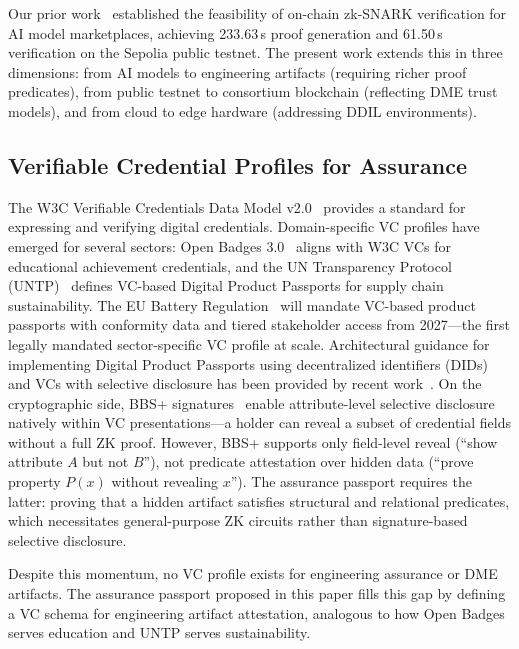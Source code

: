 Our prior work~\cite{jagannath2025zksnark} established the feasibility of on-chain zk-SNARK verification for AI model marketplaces, achieving 233.63\,s proof generation and 61.50\,s verification on the Sepolia public testnet.
The present work extends this in three dimensions: from AI models to engineering artifacts (requiring richer proof predicates), from public testnet to consortium blockchain (reflecting DME trust models), and from cloud to edge hardware (addressing DDIL environments).

\subsection{Verifiable Credential Profiles for Assurance}
\label{sec:rw-vc-profiles}

The W3C Verifiable Credentials Data Model v2.0~\cite{w3c_vc} provides a standard for expressing and verifying digital credentials.
Domain-specific VC profiles have emerged for several sectors: Open Badges 3.0~\cite{open_badges3} aligns with W3C VCs for educational achievement credentials, and the UN Transparency Protocol (UNTP)~\cite{untp_dpp} defines VC-based Digital Product Passports for supply chain sustainability.
The EU Battery Regulation~\cite{eu_battery_passport} will mandate VC-based product passports with conformity data and tiered stakeholder access from 2027---the first legally mandated sector-specific VC profile at scale.
Architectural guidance for implementing Digital Product Passports using decentralized identifiers (DIDs) and VCs with selective disclosure has been provided by recent work~\cite{dpp_did_vc2024}.
On the cryptographic side, BBS+ signatures~\cite{tessaro2023bbs} enable attribute-level selective disclosure natively within VC presentations---a holder can reveal a subset of credential fields without a full ZK proof.
However, BBS+ supports only field-level reveal (``show attribute $A$ but not $B$''), not predicate attestation over hidden data (``prove property $P(x)$ without revealing $x$'').
The assurance passport requires the latter: proving that a hidden artifact satisfies structural and relational predicates, which necessitates general-purpose ZK circuits rather than signature-based selective disclosure.

Despite this momentum, no VC profile exists for engineering assurance or DME artifacts.
The assurance passport proposed in this paper fills this gap by defining a VC schema for engineering artifact attestation, analogous to how Open Badges serves education and UNTP serves sustainability.

